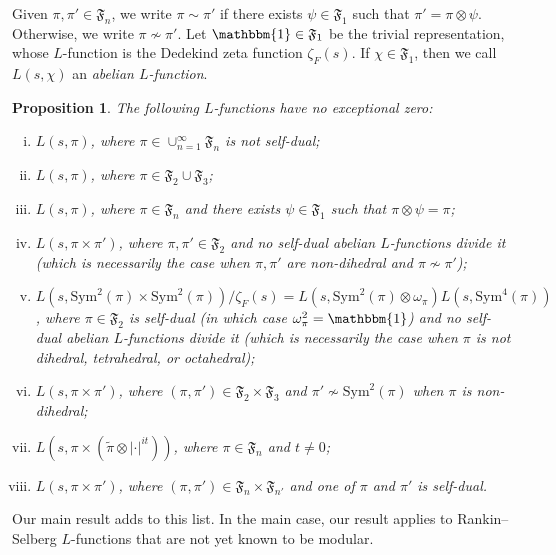 \documentclass[11pt]{amsart}
\newtheorem{proposition}[theorem]{Proposition}
\theoremstyle{remark}
\numberwithin{equation}{section}
\begin{document}
Given $\pi,\pi'\in\mathfrak{F}_{n}$, we write $\pi\sim\pi'$ if there exists $\psi\in\mathfrak{F}_{1}$ such that $\pi'=\pi\otimes\psi$.  Otherwise, we write $\pi\not\sim\pi'$.  Let $\mathbbm{1}\in\mathfrak{F}_{1}$ be the trivial representation, whose $L$-function is the Dedekind zeta function $\zeta_F(s)$.  If $\chi\in\mathfrak{F}_1$, then we call $L(s,\chi)$ an {\it abelian $L$-function}.
\begin{proposition}
\label{prop:list}
The following $L$-functions have no exceptional zero:
\begin{enumerate}[(i)]
	\item \cite{HoffsteinRamakrishnan,Wattanawanichkul} $L(s,\pi)$, where $\pi\in\cup_{n=1}^{\infty}\mathfrak{F}_{n}$ is not self-dual;
	\item \cite{Banks,HoffsteinRamakrishnan} $L(s,\pi)$, where $\pi\in\mathfrak{F}_{2}\cup \mathfrak{F}_{3}$;
	\item \cite{Luo} $L(s,\pi)$, where $\pi\in\mathfrak{F}_n$ and there exists $\psi\in\mathfrak{F}_1$ such that $\pi\otimes\psi=\pi$;
	\item \cite{RamakrishnanWang} $L(s,\pi\times\pi')$, where $\pi,\pi'\in\mathfrak{F}_{2}$ and no self-dual abelian $L$-functions divide it (which is necessarily the case when $\pi,\pi'$ are non-dihedral and $\pi\not\sim\pi'$);
	\item \cite{RamakrishnanWang} $L(s,\mathrm{Sym}^2(\pi)\times\mathrm{Sym}^2(\pi))/\zeta_F(s)=L(s,\mathrm{Sym}^2(\pi)\otimes\omega_{\pi})L(s,\mathrm{Sym}^4(\pi))$, where $\pi\in\mathfrak{F}_{2}$ is self-dual (in which case $\omega_{\pi}^2=\mathbbm{1}$) and no self-dual abelian $L$-functions divide it (which is necessarily the case when $\pi$ is not dihedral, tetrahedral, or octahedral);
	\item \cite{Luo} $L(s,\pi\times\pi')$, where $(\pi,\pi')\in\mathfrak{F}_{2}\times\mathfrak{F}_{3}$ and $\pi'\not\sim\mathrm{Sym}^2(\pi)$ when $\pi$ is non-dihedral;
	\item \cite{HumphriesThorner,Wattanawanichkul} $L(s,\pi\times(\widetilde{\pi}\otimes|\cdot|^{it}))$, where $\pi\in\mathfrak{F}_n$ and $t\neq 0$;
	\item \cite{Wattanawanichkul} $L(s,\pi\times\pi')$, where $(\pi,\pi')\in\mathfrak{F}_{n} \times\mathfrak{F}_{n'}$ and one of $\pi$ and $\pi'$ is self-dual.
\end{enumerate}
\end{proposition}

Our main result adds to this list.  In the main case, our result applies to Rankin--Selberg $L$-functions that are not yet known to be modular.
\end{document}
